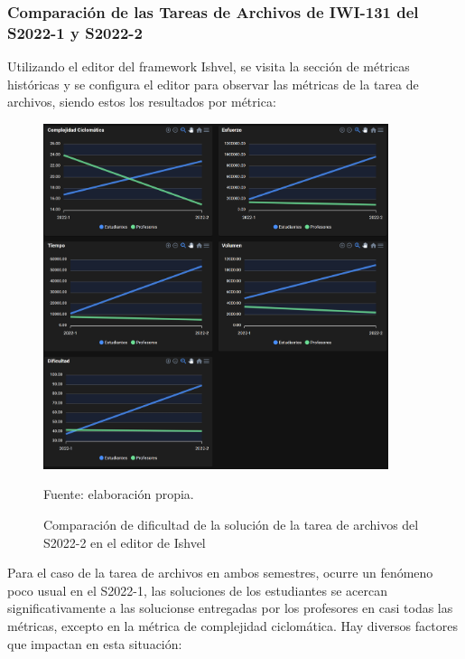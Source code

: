 \documentclass[letterpaper,12pt]{article}
\begin{document}
\subsubsection{Comparación de las Tareas de Archivos de IWI-131 del S2022-1 y S2022-2}
Utilizando el editor del framework Ishvel, se visita la sección de métricas históricas y se configura el editor para observar las métricas de la tarea de archivos, siendo estos los resultados por métrica:
\begin{figure}[H]
  \centering
  \includegraphics[width=0.9\textwidth]{figures/metricsList3.png}
  \caption{Comparación de dificultad de la solución de la tarea de archivos del S2022-2 en el editor de Ishvel} Fuente: elaboración propia.
  \label{img:metricsList3}
\end{figure}

Para el caso de la tarea de archivos en ambos semestres, ocurre un fenómeno poco usual en el S2022-1, las soluciones de los estudiantes se acercan significativamente a las solucionse entregadas por los profesores en casi todas las métricas, excepto en la métrica de complejidad ciclomática. Hay diversos factores que impactan en esta situación:
\end{document}
